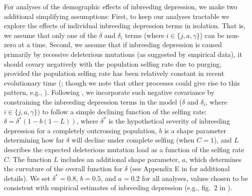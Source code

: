 \documentclass[11pt]{article}
\begin{document}



For analyses of the demographic effects of inbreeding depression, we make two additional simplifying assumptions: First, to keep our analyses tractable we explore the effects of individual inbreeding depression terms in isolation. That is, we assume that only one of the $\delta$ and $\delta_i$ terms (where $i \in \{j,a,\gamma\}$) can be non-zero at a time. Second, we assume that if inbreeding depression is caused primarily by recessive deleterious mutations (as suggested by empirical data), it should covary negatively with the population selfing rate due to purging, provided the population selfing rate has been relatively constant in recent evolutionary time (\citealt{Charlesworth2009}; though we note that other processes could give rise to this pattern, e.g., \citealt{CrnokrakBarrett2002, Charlesworth2009,HedrickGarcia-Dorado2016}). Following \citet{Olito2019}, we incorporate such negative covariance by constraining the inbreeding depression terms in the model ($\delta$ and $\delta_i$, where $i \in \{j,a,\gamma\}$) to follow a simple declining function of the selfing rate: $\delta = \delta^{\ast} (1 - b (1 - L))$, where $\delta^{\ast}$ is the hypothetical severity of inbreeding depression for a completely outcrossing population, $b$ is a shape parameter determining how far $\delta$ will decline under complete selfing (when $C = 1$), and $L$ describes the expected deleterious mutation load as a function of the selfing rate $C$. The function $L$ includes an additional shape parameter, $a$, which determines the curvature of the overall function for $\delta$ (see Appendix E in \citealt{Olito2019} for additional details). We set $\delta^{\ast} = 0.8$, $b = 0.5$, and $a = 0.2$ for all analyses, values chosen to be consistent with empirical estimates of inbreeding depression (e.g., fig.~2 in \citealt{HusbandSchemske1996}). 
\end{document}

